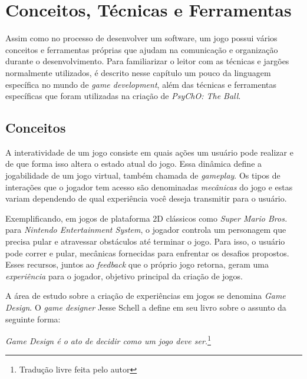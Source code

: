 
\chapter{Conceitos, Técnicas e Ferramentas}
\label{cap:conceitos_tecnicas_e_ferramentas}

Assim como no processo de desenvolver um software, um jogo possui vários conceitos e ferramentas próprias que ajudam na comunicação e organização durante o desenvolvimento.
Para familiarizar o leitor com as técnicas e jargões normalmente utilizados, é descrito nesse capítulo um pouco da linguagem específica no mundo de \textit{game development}, além das técnicas e ferramentas específicas que foram utilizadas na criação de \textit{PsyChO: The Ball}.

\section{Conceitos}
\label{sec:conceitos}
A interatividade de um jogo consiste em quais ações um usuário pode realizar e de que forma isso altera o estado atual do jogo. Essa dinâmica define a jogabilidade de um jogo virtual, também chamada de \textit{gameplay}. Os tipos de interações que o jogador tem acesso são denominadas \textit{mecânicas} do jogo e estas variam dependendo de qual experiência você deseja transmitir para o usuário.

Exemplificando, em jogos de plataforma 2D clássicos como \textit{Super Mario Bros.} para \textit{Nintendo Entertainment System}\cite{mario}, o jogador controla um personagem que precisa pular e atravessar obstáculos até terminar o jogo. Para isso, o usuário pode correr e pular, mecânicas fornecidas para enfrentar os desafios propostos. Esses recursos, juntos ao \textit{feedback} que o próprio jogo retorna, geram uma \textit{experiência} para o jogador, objetivo principal da criação de jogos.

A área de estudo sobre a criação de experiências em jogos se denomina \textit{Game Design}. O \textit{game designer} Jesse Schell a define em seu livro sobre o assunto \cite{jessegamedesign} da seguinte forma:

\begin{displayquote}
  \textit{Game Design é o ato de decidir como um jogo deve ser.}\footnote{Tradução livre feita pelo autor}
\end{displayquote}


